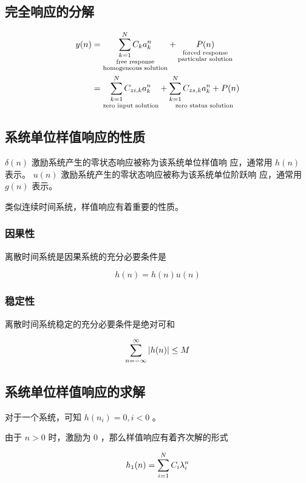 \documentclass[cn,11pt,chinese,black,simple]{../elegantbook}
\begin{document}
\subsection{完全响应的分解}

\[\begin{aligned}
    y(n) &= \underset{\substack{\text{free response}\\ \text{homogeneous solution}}}{\displaystyle\sum_{k=1}^{N}C_k a_k^n }+ \underset{\substack{\text{forced response} \\ \text{particular solution}}}{ P(n)} \\
    &=  \underset{\text{zero input solution}}{\displaystyle\sum_{k=1}^{N}C_{zi,k} a_k^n} + \underset{\text{zero status solution}}{\displaystyle\sum_{k=1}^{N}C_{zs,k} a_k^n + P(n)}
\end{aligned}\]

\subsection{系统单位样值响应的性质}

\(\delta(n)\) 激励系统产生的零状态响应被称为该系统单位样值响
应，通常用 \(h(n)\) 表示。
\(u(n)\) 激励系统产生的零状态响应被称为该系统单位阶跃响
应，通常用 \(g(n)\) 表示。

类似连续时间系统，样值响应有着重要的性质。

\subsubsection{因果性}

离散时间系统是因果系统的充分必要条件是

\[h(n) = h(n) u(n)\]

\subsubsection{稳定性}

离散时间系统稳定的充分必要条件是绝对可和

\[\displaystyle\sum_{n=-\infty}^{\infty} \left| h(n) \right| \leq M\]

\subsection{系统单位样值响应的求解}

对于一个系统，可知 \(h(n_i) = 0, i < 0\) 。

由于 \(n > 0\) 时，激励为 \(0\) ，那么样值响应有着齐次解的形式 

\[h_1(n) = \displaystyle\sum_{i = 1}^N C_i \lambda_i^n\]
\end{document}
